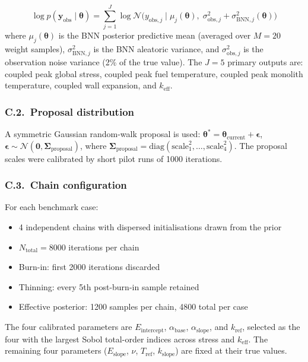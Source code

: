 \documentclass[11pt,a4paper]{article}
\newcommand{\keff}{\ensuremath{k_{\mathrm{eff}}}}
\newcommand{\Eint}{\ensuremath{E_{\mathrm{intercept}}}}
\newcommand{\Eslope}{\ensuremath{E_{\mathrm{slope}}}}
\newcommand{\abase}{\ensuremath{\alpha_{\mathrm{base}}}}
\newcommand{\aslope}{\ensuremath{\alpha_{\mathrm{slope}}}}
\newcommand{\kref}{\ensuremath{k_{\mathrm{ref}}}}
\newcommand{\Tref}{\ensuremath{T_{\mathrm{ref}}}}
\newcommand{\kslope}{\ensuremath{k_{\mathrm{slope}}}}
\begin{document}
\begin{equation}
\log p(\mathbf{y}_\mathrm{obs} \mid \boldsymbol{\theta})
= \sum_{j=1}^{J} \log \mathcal{N}\bigl(y_{\mathrm{obs},j} \mid
  \mu_j(\boldsymbol{\theta}),\;
  \sigma_{\mathrm{obs},j}^2 + \sigma_{\mathrm{BNN},j}^2(\boldsymbol{\theta})\bigr)
\end{equation}
where $\mu_j(\boldsymbol{\theta})$ is the BNN posterior predictive mean
(averaged over $M = 20$ weight samples),
$\sigma_{\mathrm{BNN},j}^2$ is the BNN aleatoric variance, and
$\sigma_{\mathrm{obs},j}^2$ is the observation noise variance (2\% of
the true value). The $J = 5$ primary outputs are: coupled peak global
stress, coupled peak fuel temperature, coupled peak monolith
temperature, coupled wall expansion, and \keff{}.

\subsubsection*{C.2.~Proposal distribution}

A symmetric Gaussian random-walk proposal is used:
$\boldsymbol{\theta}^* = \boldsymbol{\theta}_\mathrm{current} +
\boldsymbol{\epsilon}$,
$\boldsymbol{\epsilon} \sim \mathcal{N}(\mathbf{0},
\boldsymbol{\Sigma}_\mathrm{proposal})$,
where $\boldsymbol{\Sigma}_\mathrm{proposal} =
\mathrm{diag}(\mathrm{scale}_1^2, \ldots, \mathrm{scale}_4^2)$.
The proposal scales were calibrated by short pilot runs of 1000
iterations.

\subsubsection*{C.3.~Chain configuration}

For each benchmark case:
\begin{itemize}
\item 4 independent chains with dispersed initialisations drawn from
  the prior
\item $N_\mathrm{total} = 8000$ iterations per chain
\item Burn-in: first 2000 iterations discarded
\item Thinning: every 5th post-burn-in sample retained
\item Effective posterior: 1200 samples per chain, 4800 total per case
\end{itemize}

The four calibrated parameters are \Eint{}, \abase{}, \aslope{}, and
\kref{}, selected as the four with the largest Sobol total-order indices
across stress and \keff{}. The remaining four parameters (\Eslope{},
$\nu$, \Tref{}, \kslope{}) are fixed at their true values.
\end{document}
